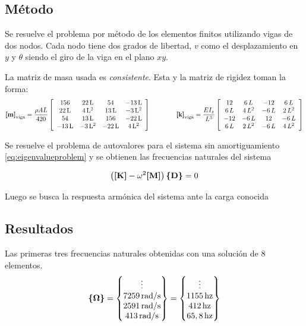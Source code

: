 \documentclass[onecolumn,10pt,titlepage,a4paper]{article}
\begin{document}
\subsection{Método}
Se resuelve el problema por método de los elementos finitos utilizando vigas de dos nodos. Cada nodo tiene dos grados de libertad, $v$ como el desplazamiento en $y$ y $\theta$ siendo el giro de la viga en el plano $x\!y$.

La matriz de masa usada es \textit{consistente}. Esta y la matriz de rigidez toman la forma: \cite[p.379]{cook2007concepts}
\[
\Mme{m}_{\mathrm{viga}}=\frac{\rho A L}{420}\left[\begin{array}{cccc} 156 & 22\,\mathrm{L} & 54 & -13\,\mathrm{L}\\ 22\,\mathrm{L} & 4\,{\mathrm{L}}^2 & 13\,\mathrm{L} & -3\,{\mathrm{L}}^2\\ 54 & 13\,\mathrm{L} & 156 & -22\,\mathrm{L}\\ -13\,\mathrm{L} & -3\,{\mathrm{L}}^2 & -22\,\mathrm{L} & 4\,{\mathrm{L}}^2 \end{array}\right] \qquad \qquad \Mme{k}_{\mathrm{viga}}=\frac{E I_z}{L^3} \left[\begin{array}{cccc} 12 & 6\,L & -12 & 6\,L\\ 6\,L & 4\,L^2 & -6\,L & 2\,L^2\\ -12 & -6\,L & 12 & -6\,L\\ 6\,L & 2\,L^2 & -6\,L & 4\,L^2 \end{array}\right]
\]

Se resuelve el problema de autovalores para el sistema sin amortiguamiento \eqref{eq:eigenvalueproblem} y se obtienen las frecuencias naturales del sistema 

\begin{equation} \label{eq:eigenvalueproblem}
	\left( \Mme{K} - \omega^2 \Mme{M}\right)\Cme{D}= 0
\end{equation}

Luego se busca la respuesta armónica del sistema ante la carga conocida 




\subsection{Resultados}
Las primeras tres frecuencias naturales obtenidas con una solución de 8 elementos.
\[
\Cme{\Omega} = \begin{Bmatrix}
\vdots \\
7259 \si{\, \radian \per \second}\\
2591 \si{\, \radian \per \second}\\
413 \si{\, \radian \per \second}
\end{Bmatrix}=\begin{Bmatrix}
\vdots \\
1155\, \textrm{hz}\\
412\, \textrm{hz}\\
65,8\, \textrm{hz} 
\end{Bmatrix}
\]
\end{document}
